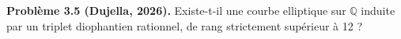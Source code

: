 \textbf{Problème 3.5 (Dujella, 2026).} Existe-t-il une courbe elliptique sur $\mathbb{Q}$ induite par un triplet diophantien rationnel, de rang strictement supérieur à 12 ?
